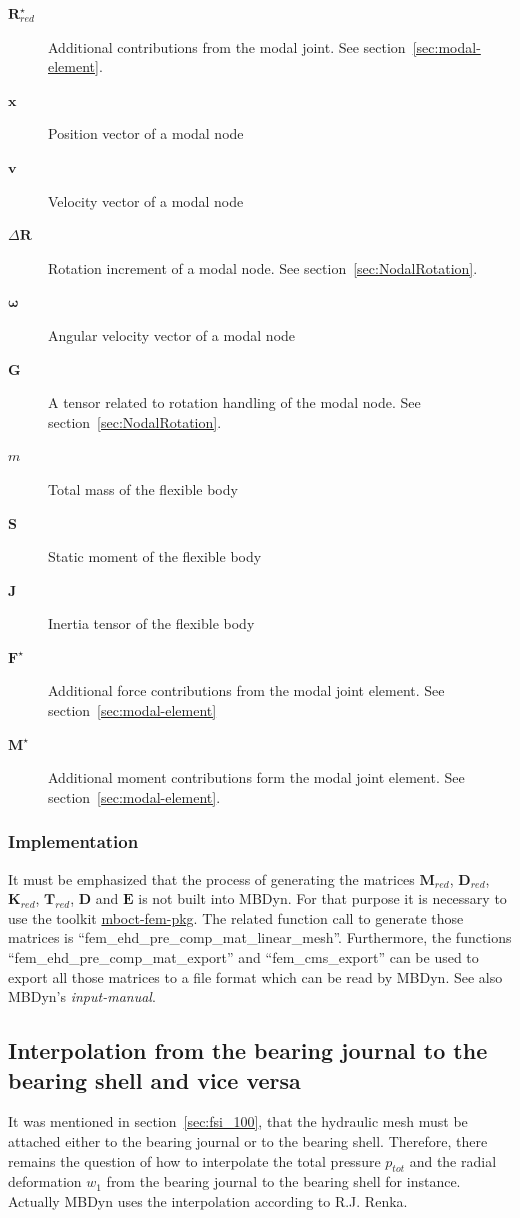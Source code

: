\begin{description}
\item[$\boldsymbol{R}_{red}^{\star}$] Additional contributions from the modal joint. See section~\ref{sec:modal-element}.
\item[$\boldsymbol{x}$] Position vector of a modal node
\item[$\boldsymbol{v}$] Velocity vector of a modal node
\item[$\Delta\boldsymbol{R}$] Rotation increment of a modal node. See section~\ref{sec:NodalRotation}.
\item[$\boldsymbol{\omega}$] Angular velocity vector of a modal node
\item[$\boldsymbol{G}$] A tensor related to rotation handling of the modal node. See section~\ref{sec:NodalRotation}.
\item[$m$] Total mass of the flexible body
\item[$\boldsymbol{S}$] Static moment of the flexible body
\item[$\boldsymbol{J}$] Inertia tensor of the flexible body
\item[$\boldsymbol{F}^{\star}$] Additional force contributions from the modal joint element. See section~\ref{sec:modal-element}
\item[$\boldsymbol{M}^{\star}$] Additional moment contributions form the modal joint element. See section~\ref{sec:modal-element}.
\end{description}
\subsubsection{Implementation}
It must be emphasized that the process of generating the matrices $\boldsymbol{M}_{red}$, $\boldsymbol{D}_{red}$, $\boldsymbol{K}_{red}$, $\boldsymbol{T}_{red}$, $\boldsymbol{D}$ and $\boldsymbol{E}$ is not built into MBDyn. For that purpose it is necessary to use the toolkit \href{https://github.com/octave-user/mboct-fem-pkg}{mboct-fem-pkg}.
The related function call to generate those matrices is ``fem\_ehd\_pre\_comp\_mat\_linear\_mesh''. Furthermore, the functions ``fem\_ehd\_pre\_comp\_mat\_export'' and ``fem\_cms\_export'' can be used to export all those matrices to a file format which can be read by MBDyn. See also MBDyn's \emph{input-manual}.

\subsection{Interpolation from the bearing journal to the bearing shell and vice versa}
It was mentioned in section~\ref{sec:fsi_100}, that the hydraulic mesh must be attached either to the bearing journal or to the bearing shell. Therefore, there remains the question of how to interpolate the total pressure $p_{tot}$ and the radial deformation $w_1$ from the bearing journal to the bearing shell for instance.
Actually MBDyn uses the interpolation according to R.J. Renka\cite{Renka-1988}.
